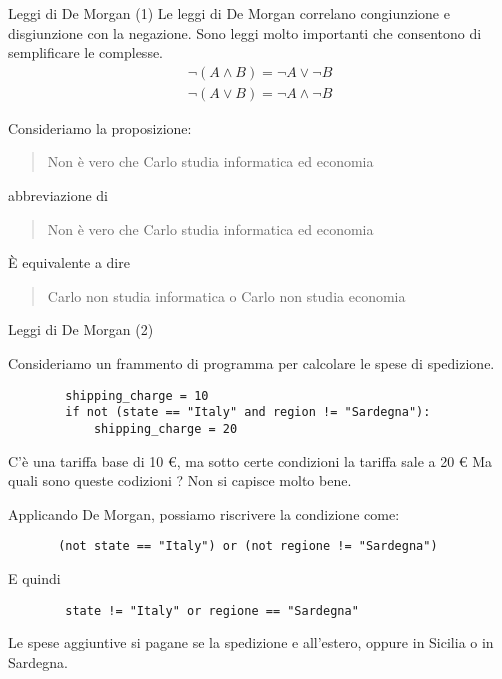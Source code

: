 \documentclass[aspectratio=169,10pt,dvipsnames,handout]{beamer}
\begin{document}
\begin{frame}{Leggi di De Morgan (1)}
    Le leggi di De Morgan correlano congiunzione e disgiunzione con la negazione. Sono leggi molto importanti che consentono di semplificare le \fp complesse.
    \begin{gather*}
        \neg (A \wedge B) = \neg A \vee \neg B\\
        \neg (A \vee B) = \neg A \wedge \neg B
    \end{gather*}

    \begin{example}
        Consideriamo la proposizione:
        \begin{quote}
            Non è vero che Carlo studia informatica ed economia
        \end{quote}
        abbreviazione di
        \begin{quote}
            Non è vero che Carlo studia informatica ed economia
        \end{quote}
        È equivalente a dire
        \begin{quote}
            Carlo non studia informatica o Carlo non studia economia
        \end{quote}
    \end{example}
\end{frame}

\begin{frame}[fragile]{Leggi di De Morgan (2)}
    \begin{example}
        Consideriamo un frammento di  programma per calcolare le spese di spedizione.

        \begin{verbatim}
        shipping_charge = 10
        if not (state == "Italy" and region != "Sardegna"):
            shipping_charge = 20
    \end{verbatim}

        C'è una tariffa base di 10 €, ma sotto certe condizioni la tariffa sale a 20 € Ma quali sono queste codizioni ? Non si capisce molto bene.

        \pause \medskip
        Applicando De Morgan, possiamo riscrivere la condizione come:
        \begin{verbatim}
       (not state == "Italy") or (not regione != "Sardegna")
    \end{verbatim}

        \pause \medskip
        E quindi
        \begin{verbatim}
        state != "Italy" or regione == "Sardegna"
    \end{verbatim}
        Le spese aggiuntive si pagane se la spedizione e all'estero, oppure in Sicilia o in Sardegna.
    \end{example}
\end{frame}
\end{document}
